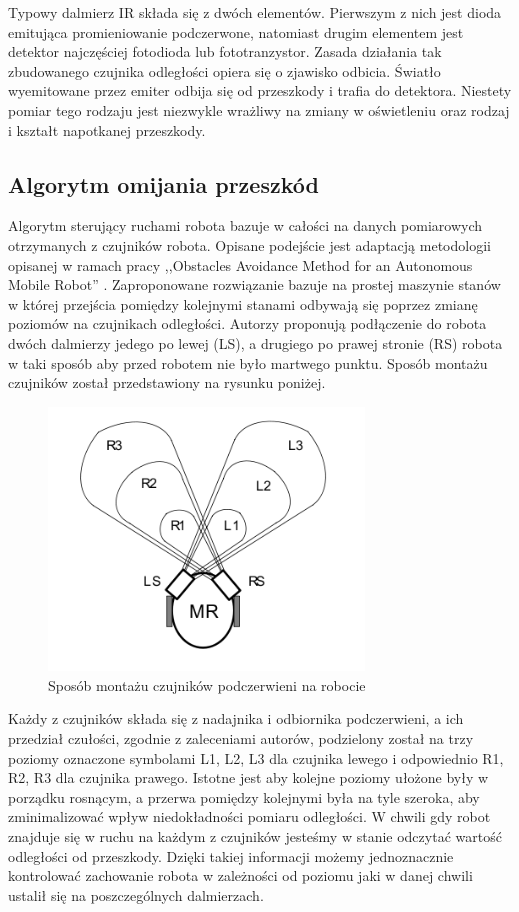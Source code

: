 Typowy dalmierz IR składa się z dwóch elementów. Pierwszym z nich jest dioda
emitująca promieniowanie podczerwone, natomiast drugim elementem jest detektor
najczęściej fotodioda lub fototranzystor. 
Zasada działania tak zbudowanego
czujnika odległości opiera się o zjawisko odbicia. Światło wyemitowane przez
emiter odbija się od przeszkody i trafia do detektora. Niestety pomiar tego
rodzaju jest niezwykle wrażliwy na zmiany w oświetleniu oraz rodzaj i kształt
napotkanej przeszkody.
 
\subsection{Algorytm omijania przeszkód}
Algorytm sterujący ruchami robota bazuje w całości na danych pomiarowych
otrzymanych z czujników robota. Opisane podejście jest adaptacją metodologii
opisanej w ramach pracy ,,Obstacles Avoidance Method for an Autonomous Mobile
Robot'' \cite{ObstaclesAvoidanceIR}. Zaproponowane rozwiązanie bazuje na prostej
maszynie stanów w której przejścia pomiędzy kolejnymi stanami odbywają się
poprzez zmianę poziomów na czujnikach odległości. Autorzy proponują podłączenie
do robota dwóch dalmierzy jedego po lewej (LS), a drugiego po prawej stronie
(RS) robota w taki sposób aby przed robotem nie było martwego punktu. Sposób
montażu czujników został przedstawiony na rysunku poniżej.

\begin{figure}[hb]
 \centering
 \includegraphics[height=70mm]{../images/ch04/ir_sensor_position.png}
 \caption{Sposób montażu czujników podczerwieni na robocie \cite{ObstaclesAvoidanceIR}}
 \label{fig:IRSensorPosition}
\end{figure}

Każdy z czujników składa się z nadajnika i odbiornika podczerwieni, a ich
przedział czułości, zgodnie z zaleceniami autorów, podzielony został na trzy
poziomy oznaczone symbolami L1, L2, L3 dla czujnika lewego i odpowiednio R1, R2,
R3 dla czujnika prawego. Istotne jest aby kolejne poziomy ułożone były w porządku
rosnącym, a przerwa pomiędzy kolejnymi była na tyle szeroka, aby zminimalizować
wpływ niedokładności pomiaru odległości. W chwili gdy robot znajduje się w ruchu
na każdym z czujników jesteśmy w stanie odczytać wartość odległości od
przeszkody. Dzięki takiej informacji możemy jednoznacznie kontrolować zachowanie
robota w zależności od poziomu jaki w danej chwili ustalił się na poszczególnych
dalmierzach. 

